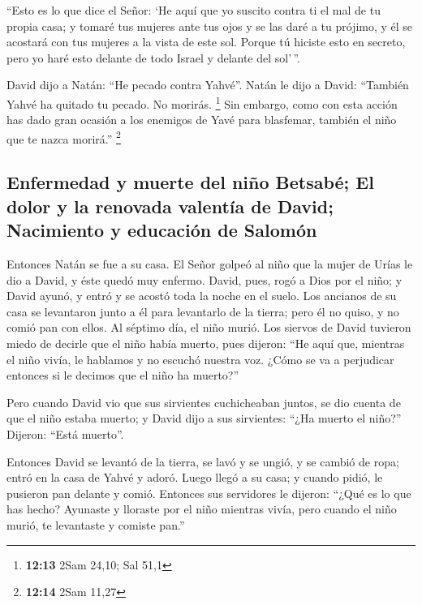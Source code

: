 \begin{paracol}{2}
 ``Esto es lo que dice el Señor: `He aquí que yo suscito
contra ti el mal de tu propia casa; y tomaré tus mujeres ante tus ojos y
se las daré a tu prójimo, y él se acostará con tus mujeres a la vista de
este sol.  Porque tú hiciste esto en secreto, pero yo
haré esto delante de todo Israel y delante del sol'\,''.

 David dijo a Natán: ``He pecado contra Yahvé''. Natán le
dijo a David: ``También Yahvé ha quitado tu pecado. No morirás.
\footnote{\textbf{12:13} 2Sam 24,10; Sal 51,1}  Sin
embargo, como con esta acción has dado gran ocasión a los enemigos de
Yavé para blasfemar, también el niño que te nazca morirá.'' \footnote{\textbf{12:14}
  2Sam 11,27}

\hypertarget{enfermedad-y-muerte-del-niuxf1o-betsabuxe9-el-dolor-y-la-renovada-valentuxeda-de-david-nacimiento-y-educaciuxf3n-de-salomuxf3n}{%
\subsection{Enfermedad y muerte del niño Betsabé; El dolor y la renovada
valentía de David; Nacimiento y educación de
Salomón}\label{enfermedad-y-muerte-del-niuxf1o-betsabuxe9-el-dolor-y-la-renovada-valentuxeda-de-david-nacimiento-y-educaciuxf3n-de-salomuxf3n}}

 Entonces Natán se fue a su casa. El Señor golpeó al niño
que la mujer de Urías le dio a David, y éste quedó muy enfermo.
 David, pues, rogó a Dios por el niño; y David ayunó, y
entró y se acostó toda la noche en el suelo.  Los
ancianos de su casa se levantaron junto a él para levantarlo de la
tierra; pero él no quiso, y no comió pan con ellos.  Al
séptimo día, el niño murió. Los siervos de David tuvieron miedo de
decirle que el niño había muerto, pues dijeron: ``He aquí que, mientras
el niño vivía, le hablamos y no escuchó nuestra voz. ¿Cómo se va a
perjudicar entonces si le decimos que el niño ha muerto?''

 Pero cuando David vio que sus sirvientes cuchicheaban
juntos, se dio cuenta de que el niño estaba muerto; y David dijo a sus
sirvientes: ``¿Ha muerto el niño?'' Dijeron: ``Está muerto''.

 Entonces David se levantó de la tierra, se lavó y se
ungió, y se cambió de ropa; entró en la casa de Yahvé y adoró. Luego
llegó a su casa; y cuando pidió, le pusieron pan delante y comió.
 Entonces sus servidores le dijeron: ``¿Qué es lo que has
hecho? Ayunaste y lloraste por el niño mientras vivía, pero cuando el
niño murió, te levantaste y comiste pan.''


\end{paracol}

